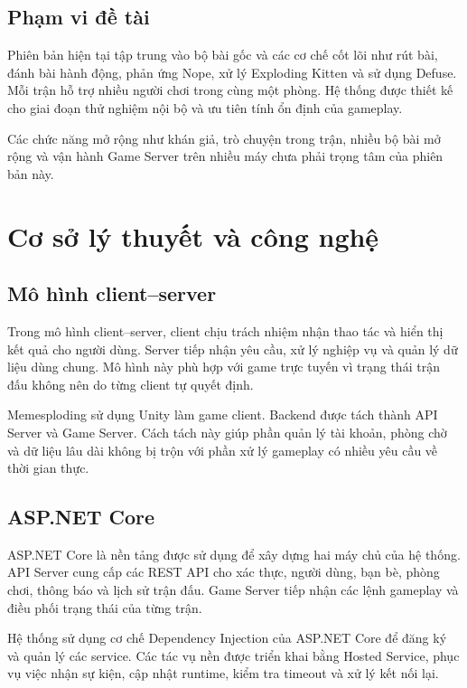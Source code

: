 \documentclass[a4paper]{report}
\begin{document}
\section{Phạm vi đề tài}

Phiên bản hiện tại tập trung vào bộ bài gốc và các cơ chế cốt lõi như rút bài,
đánh bài hành động, phản ứng Nope, xử lý Exploding Kitten và sử dụng Defuse.
Mỗi trận hỗ trợ nhiều người chơi trong cùng một phòng. Hệ thống được thiết kế
cho giai đoạn thử nghiệm nội bộ và ưu tiên tính ổn định của gameplay.

Các chức năng mở rộng như khán giả, trò chuyện trong trận, nhiều bộ bài mở rộng
và vận hành Game Server trên nhiều máy chưa phải trọng tâm của phiên bản này.

\chapter{Cơ sở lý thuyết và công nghệ}

\section{Mô hình client--server}

Trong mô hình client--server, client chịu trách nhiệm nhận thao tác và hiển thị
kết quả cho người dùng. Server tiếp nhận yêu cầu, xử lý nghiệp vụ và quản lý dữ
liệu dùng chung. Mô hình này phù hợp với game trực tuyến vì trạng thái trận đấu
không nên do từng client tự quyết định.

Memesploding sử dụng Unity làm game client. Backend được tách thành API Server
và Game Server. Cách tách này giúp phần quản lý tài khoản, phòng chờ và dữ liệu
lâu dài không bị trộn với phần xử lý gameplay có nhiều yêu cầu về thời gian thực.

\section{ASP.NET Core}

ASP.NET Core là nền tảng được sử dụng để xây dựng hai máy chủ của hệ thống.
API Server cung cấp các REST API cho xác thực, người dùng, bạn bè, phòng chơi,
thông báo và lịch sử trận đấu. Game Server tiếp nhận các lệnh gameplay và điều
phối trạng thái của từng trận.

Hệ thống sử dụng cơ chế Dependency Injection của ASP.NET Core để đăng ký và
quản lý các service. Các tác vụ nền được triển khai bằng Hosted Service, phục vụ
việc nhận sự kiện, cập nhật runtime, kiểm tra timeout và xử lý kết nối lại.
\end{document}
